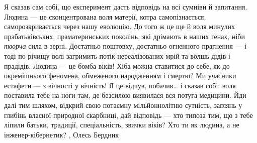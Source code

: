 Я сказав сам собі, що експеримент дасть відповідь на всі сумніви й запитання.
Людина — це сконцентрована воля матерії, котра самопізнається,
саморозкривається через нашу еволюцію. До того ж це ще й воля минулих
прабатьківських, праматеринських поколінь, які дрімають в наших генах, ніби
\emph{творча} сила в зерні. Достатньо поштовху, достатньо огненного прагнення — і тоді
по річищу волі загримить потік нереалізованих мрій та волшь дідів і прадідів.
Людина — це бомба віків! Хіба можна ставитися до себе, як до окремішнього
феномена, обмеженого народженням і смертю? Ми учасники естафети — з вічності у
вічність! Я це відчув, побачив… і сказав собі: воля поставила тебе на ноги там,
де безсилою виявилася вся потуга медицини. Йди далі тим шляхом, відкрий свою
потаємну мільйоннолітню сутність, заглянь у глибінь власної природної
скарбниці, дай відповідь — хто типоза тим, що з тебе ліпили батьки, традиції,
спеціальність, звички віків? Хто ти як людина, а не інженер-кібернетик?
, Олесь Бердник
